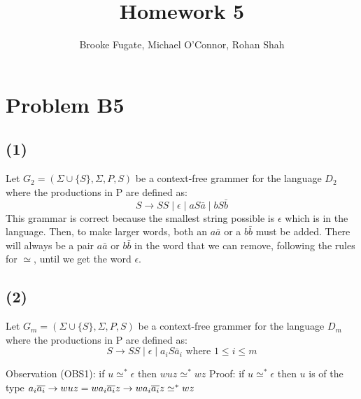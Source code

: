 \documentclass[12pt]{article}
\begin{document}
\pagestyle{plain}
\titleformat{\subsection}[runin]
  {\normalfont\large\bfseries}{\thesubsection}{1em}{}

\title{Homework 5}
\author{Brooke Fugate, Michael O'Connor, Rohan Shah}
\date{}

\maketitle

\section*{Problem B5}
\subsection*{(1)} Let $G_2 = (\Sigma\cup \{S\},\Sigma,P,S)$ be a context-free
grammer for the language $D_2$ where the productions in P are defined as:
$$ S \rightarrow SS \mid \epsilon \mid aS\bar a \mid bS\bar b$$
This grammar is correct because the smallest string possible is $\epsilon$ which is in the language. Then, to make larger words, both an $a \bar a$ or a $b \bar b$ must be added. There will always be a pair $a \bar a$ or $b \bar b$ in the word that we can remove, following the rules for $\simeq$, until we get the word $\epsilon$.

\subsection*{(2)} Let $G_m = (\Sigma\cup \{S\},\Sigma,P,S)$ be a context-free
grammer for the language $D_m$ where the productions in P are defined as:
$$S \rightarrow SS\mid \epsilon \mid a_iS\bar a_i \text{ where } 1\le i\le m$$


Observation (OBS1): if $u \simeq^* \epsilon$ then $wuz \simeq^* wz$\newline
Proof: if $u \simeq^* \epsilon$ then $u$ is of the type $a_i\overline{a_i} \rightarrow wuz = wa_i\overline{a_i}z \rightarrow wa_i\overline{a_i}z \simeq^* wz$\newline
\end{document}
